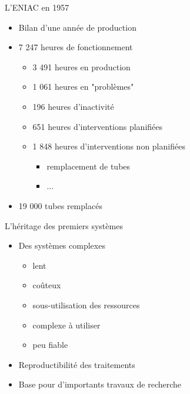 \begin{frame}{L’ENIAC en 1957}
\begin{itemize}
\item Bilan d'une année de production
\item 7 247 heures de fonctionnement
\begin{itemize}
\item 3 491 heures en production
\item 1 061 heures en "problèmes"
\item 196 heures d’inactivité
\item 651 heures d’interventions planifiées
\item 1 848 heures d’interventions non planifiées
\begin{itemize}
\item remplacement de tubes
\item ...
\end{itemize}
\end{itemize}
\item 19 000 tubes remplacés
\end{itemize}
\end{frame}



\begin{frame}{L'héritage des premiers systèmes}
\begin{itemize}
\item Des systèmes complexes
\begin{itemize}
\item lent
\item coûteux
\item sous-utilisation des ressources
\item complexe à utiliser
\item peu fiable
\end{itemize}
\item Reproductibilité des traitements
\item Base pour d'importants travaux de recherche
\end{itemize}
\end{frame}


